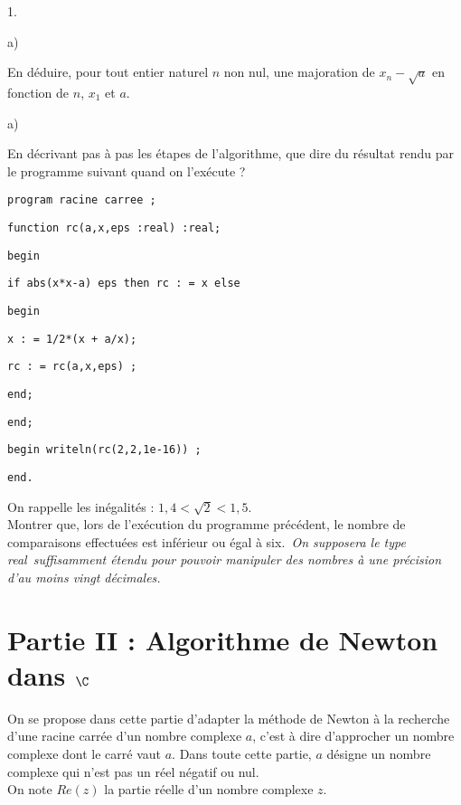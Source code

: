 \documentclass[11pt]{article}%
\begin{document}
\begin{noliste}{1.}
\begin{noliste}{a)}
\item En déduire, pour tout entier naturel $n$ non nul, une majoration
de $x_{n}-\sqrt{a}$ en fonction de $n$, $x_{1}$ et $a$.
\end{noliste}

\item 

\begin{noliste}{a)}
 \setlength{\itemsep}{2mm}
\item En décrivant pas à pas les étapes de l'algorithme, que dire du
résultat rendu par le programme suivant quand on l'exécute ?{}

\texttt{program\ racine\ carree\ ;}

\texttt{function\ rc(a,x,eps\ :real)\ :real;}

\texttt{begin}

\texttt{if\ abs(x*x-a) \TEXTsymbol{<}eps then\ rc\ : = x\ else}

\qquad \qquad \qquad \qquad \qquad \qquad \qquad \qquad \qquad
\texttt{begin}

\qquad \qquad \qquad \qquad \qquad \qquad \qquad \qquad \qquad \qquad 
\texttt{x : = 1/2*(x + a/x);}

\qquad \qquad \qquad \qquad \qquad \qquad \qquad \qquad \qquad \qquad 
\texttt{rc : = rc(a,x,eps) ;\ }

\qquad \qquad \qquad \qquad \qquad \qquad \qquad \qquad \qquad
\texttt{end;}

\texttt{end;}

\texttt{begin\ writeln(rc(2,2,1e-16))\ ;}

\texttt{end.}

\item On rappelle les inégalités : $1,4<\sqrt{2}<1,5$.\\
Montrer que, lors de l'exécution du programme précédent, le nombre de
comparaisons effectuées est inférieur ou égal à six.\textit{\ On
supposera
le type real\ suffisamment étendu pour pouvoir manipuler des nombres à
une précision d'au moins vingt décimales. }
\end{noliste}
\end{noliste}

\section*{Partie II\hspace{0.2cm} : Algorithme de Newton dans $\C$}

On se propose dans cette partie d'adapter la méthode de Newton à la
recherche d'une racine carrée d'un nombre complexe $a$, c'est à dire
d'approcher un nombre complexe dont le carré vaut $a$. Dans toute cette
partie, $a$ désigne un nombre complexe qui n'est pas un réel négatif ou
nul.\\
On note $Re(z)$ la partie réelle d'un nombre complexe $z$.
\end{document}
